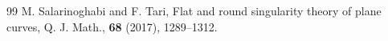 \documentclass[12pt]{amsart}
\theoremstyle{plain}
\theoremstyle{definition}
\begin{document}
\begin{thebibliography}{99}
M. Salarinoghabi and F. Tari, 
Flat and round singularity theory of plane curves, 
Q. J. Math., \textbf{68} (2017), 1289--1312.
\end{thebibliography}
\end{document}
